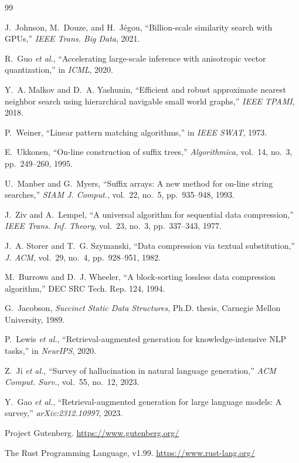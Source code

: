 \documentclass[conference]{IEEEtran}
\begin{document}
\begin{thebibliography}{99}

J.~Johnson, M.~Douze, and H.~J\'egou, ``Billion-scale similarity search with {GPU}s,'' \emph{IEEE Trans. Big Data}, 2021.

R.~Guo \emph{et al.}, ``Accelerating large-scale inference with anisotropic vector quantization,'' in \emph{ICML}, 2020.

Y.~A. Malkov and D.~A. Yashunin, ``Efficient and robust approximate nearest neighbor search using hierarchical navigable small world graphs,'' \emph{IEEE TPAMI}, 2018.

P.~Weiner, ``Linear pattern matching algorithms,'' in \emph{IEEE SWAT}, 1973.

E.~Ukkonen, ``On-line construction of suffix trees,'' \emph{Algorithmica}, vol.~14, no.~3, pp.~249--260, 1995.

U.~Manber and G.~Myers, ``Suffix arrays: A new method for on-line string searches,'' \emph{SIAM J. Comput.}, vol.~22, no.~5, pp.~935--948, 1993.

J.~Ziv and A.~Lempel, ``A universal algorithm for sequential data compression,'' \emph{IEEE Trans. Inf. Theory}, vol.~23, no.~3, pp.~337--343, 1977.

J.~A. Storer and T.~G. Szymanski, ``Data compression via textual substitution,'' \emph{J. ACM}, vol.~29, no.~4, pp.~928--951, 1982.

M.~Burrows and D.~J. Wheeler, ``A block-sorting lossless data compression algorithm,'' DEC SRC Tech. Rep. 124, 1994.

G.~Jacobson, \emph{Succinct Static Data Structures}, Ph.D. thesis, Carnegie Mellon University, 1989.

P.~Lewis \emph{et al.}, ``Retrieval-augmented generation for knowledge-intensive {NLP} tasks,'' in \emph{NeurIPS}, 2020.

Z.~Ji \emph{et al.}, ``Survey of hallucination in natural language generation,'' \emph{ACM Comput. Surv.}, vol.~55, no.~12, 2023.

Y.~Gao \emph{et al.}, ``Retrieval-augmented generation for large language models: A survey,'' \emph{arXiv:2312.10997}, 2023.

Project Gutenberg. \url{https://www.gutenberg.org/}

The Rust Programming Language, v1.99. \url{https://www.rust-lang.org/}

\end{thebibliography}
\end{document}
